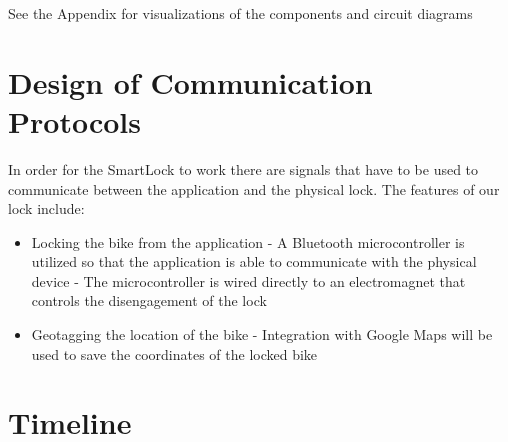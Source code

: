 \documentclass[12pt, titlepage]{article}
\begin{document}
See the Appendix for visualizations of the components and circuit diagrams


\section{Design of Communication Protocols}

In order for the SmartLock to work there are signals that have to be used to communicate between the application and the physical lock. 
The features of our lock include: 
\begin{itemize}
\item Locking the bike from the application
\subitem - A Bluetooth microcontroller is utilized so that the application is able to communicate with the physical device
\subitem - The microcontroller is wired directly to an electromagnet that controls the disengagement of the lock
\item Geotagging the location of the bike
\subitem - Integration with Google Maps will be used to save the coordinates of the locked bike
\end{itemize}

\section{Timeline}
\end{document}
